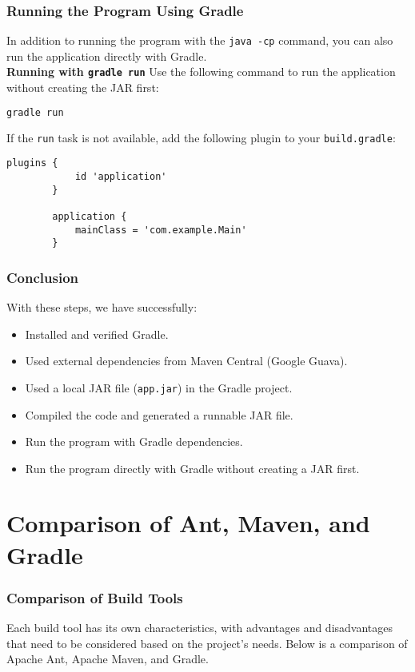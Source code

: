 \documentclass[aspectratio=169, table]{beamer}
\begin{document}
\begin{frame}[fragile]
	\vspace{20pt}
	\frametitle{Running the Program Using Gradle}
	In addition to running the program with the \texttt{java -cp} command, you can also run the application directly with Gradle.\\
	\textbf{Running with \texttt{gradle run}}
	Use the following command to run the application without creating the JAR first:
	\begin{lstlisting}[language=bash]
		gradle run
	\end{lstlisting}
	If the \texttt{run} task is not available, add the following plugin to your \texttt{build.gradle}:
	\begin{lstlisting}[style=XmlStyle]
		plugins {
			id 'application'
		}
		
		application {
			mainClass = 'com.example.Main'
		}
	\end{lstlisting}
\end{frame}

\begin{frame}[fragile]
	\frametitle{Conclusion}
	With these steps, we have successfully:
	\begin{itemize}
		\item Installed and verified Gradle.
		\item Used external dependencies from Maven Central (Google Guava).
		\item Used a local JAR file (\texttt{app.jar}) in the Gradle project.
		\item Compiled the code and generated a runnable JAR file.
		\item Run the program with Gradle dependencies.
		\item Run the program directly with Gradle without creating a JAR first.
	\end{itemize}
\end{frame}

\section{Comparison of Ant, Maven, and Gradle}
\begin{frame}[fragile]
	\frametitle{Comparison of Build Tools}
	Each build tool has its own characteristics, with advantages and disadvantages that need to be considered based on the project's needs. Below is a comparison of Apache Ant, Apache Maven, and Gradle.
\end{frame}
\end{document}
